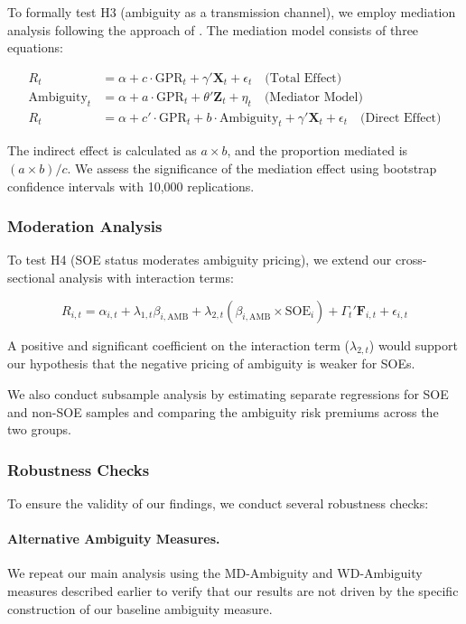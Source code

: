 \documentclass[preprint,12pt,authoryear]{elsarticle}
\begin{document}
To formally test H3 (ambiguity as a transmission channel), we employ mediation analysis following the approach of \citet{baron1986moderator}. The mediation model consists of three equations:

\begin{align}
R_{t} &= \alpha + c \cdot \text{GPR}_{t} + \gamma' \mathbf{X}_{t} + \epsilon_{t} \quad \text{(Total Effect)} \\
\text{Ambiguity}_{t} &= \alpha + a \cdot \text{GPR}_{t} + \theta' \mathbf{Z}_{t} + \eta_{t} \quad \text{(Mediator Model)} \\
R_{t} &= \alpha + c' \cdot \text{GPR}_{t} + b \cdot \text{Ambiguity}_{t} + \gamma' \mathbf{X}_{t} + \epsilon_{t} \quad \text{(Direct Effect)}
\end{align}

The indirect effect is calculated as $a \times b$, and the proportion mediated is $(a \times b) / c$. We assess the significance of the mediation effect using bootstrap confidence intervals with 10,000 replications.

\subsubsection{Moderation Analysis}

To test H4 (SOE status moderates ambiguity pricing), we extend our cross-sectional analysis with interaction terms:

\begin{equation}
R_{i,t} = \alpha_{i,t} + \lambda_{1,t} \beta_{i,\text{AMB}} + \lambda_{2,t} (\beta_{i,\text{AMB}} \times \text{SOE}_i) + \Gamma_{t}' \mathbf{F}_{i,t} + \epsilon_{i,t}
\end{equation}

A positive and significant coefficient on the interaction term ($\lambda_{2,t}$) would support our hypothesis that the negative pricing of ambiguity is weaker for SOEs.

We also conduct subsample analysis by estimating separate regressions for SOE and non-SOE samples and comparing the ambiguity risk premiums across the two groups.

\subsubsection{Robustness Checks}

To ensure the validity of our findings, we conduct several robustness checks:

\paragraph{Alternative Ambiguity Measures.} We repeat our main analysis using the MD-Ambiguity and WD-Ambiguity measures described earlier to verify that our results are not driven by the specific construction of our baseline ambiguity measure.
\end{document}

